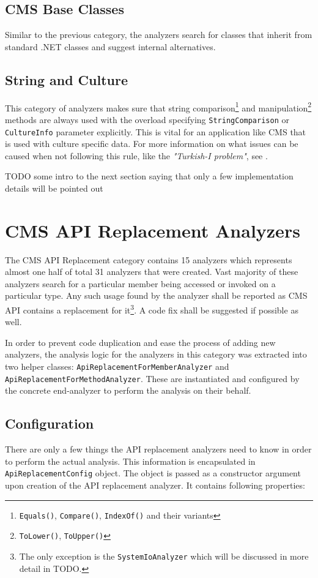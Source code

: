 \documentclass[
  digital, %
  table,   %
  lof,     %
  lot,     %
  oneside,
]{fithesis3}
\begin{document}
\subsection{CMS Base Classes}
Similar to the previous category, the analyzers search for classes that inherit from standard .NET classes and suggest internal alternatives.

\subsection{String and Culture}
This category of analyzers makes sure that string comparison\footnote{\texttt{Equals()}, \texttt{Compare()}, \texttt{IndexOf()} and their variants} and manipulation\footnote{\texttt{ToLower()}, \texttt{ToUpper()}} methods are always used with the overload specifying \texttt{StringComparison} or \texttt{CultureInfo} parameter explicitly. This is vital for an application like CMS that is used with culture specific data. For more information on what issues can be caused when not following this rule, like the \textit{"Turkish-I problem"}, see \cite{best-practices-for-using-strings-in-dot-net}. 

\bigskip\noindent
TODO some intro to the next section saying that only a few implementation details will be pointed out

\section{CMS API Replacement Analyzers}
The CMS API Replacement category contains 15 analyzers which represents almost one half of total 31 analyzers that were created. Vast majority of these analyzers search for a particular member being accessed or invoked on a particular type. Any such usage found by the analyzer shall be reported as CMS API contains a replacement for it\footnote{The only exception is the \texttt{SystemIoAnalyzer} which will be discussed in more detail in TODO.}. A code fix shall be suggested if possible as well.

In order to prevent code duplication and ease the process of adding new analyzers, the analysis logic for the analyzers in this category was extracted into two helper classes: \texttt{ApiReplacementForMemberAnalyzer} and \texttt{ApiReplacementForMethodAnalyzer}. These are instantiated and configured by the concrete end-analyzer to perform the analysis on their behalf.

\subsection{Configuration}
There are only a few things the API replacement analyzers need to know in order to perform the actual analysis. This information is encapsulated in \texttt{ApiReplacementConfig} object. The object is passed as a constructor argument upon creation of the API replacement analyzer. It contains following properties:
\end{document}
